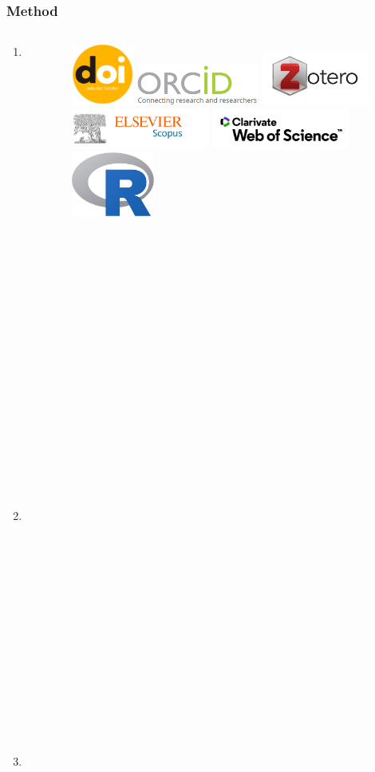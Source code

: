 \documentclass[aspectratio=169]{beamer}
\begin{document}
\begin{frame}
	\frametitle{Method}
	\begin{columns}
		\begin{column}{0.5\textwidth}
			\begin{enumerate}
				\item Get TreesLab publications' DOIs.
				\item Query databases.
                \item Run analysis.
			\end{enumerate}
		\end{column}
		\begin{column}{0.5\textwidth}
			\begin{figure}
				\centering
				\includegraphics[width=0.2\textwidth]{logos/logo_doi.png}
                \includegraphics[width=0.4\textwidth]{logos/logo_orcid.png}
                \includegraphics[width=0.35\textwidth]{logos/zotero.jpg}\newline
				\includegraphics[width=0.45\textwidth]{logos/scopus.png}
				\includegraphics[width=0.45\textwidth]{logos/wos.png}\newline
                \includegraphics[width=0.27\textwidth]{logos/Rlogo.png}

\end{figure}
\end{column}
\end{columns}
\end{frame}
\end{document}
